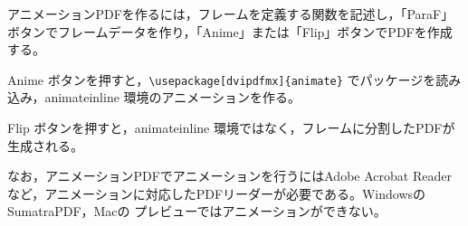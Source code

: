 \documentclass[papersize,a4paper,12pt,uplatex]{jsarticle}
\begin{document}
アニメーションPDFを作るには，フレームを定義する関数を記述し，「ParaF」ボタンでフレームデータを作り，「Anime」または「Flip」ボタンでPDFを作成する。




Anime ボタンを押すと，\verb|\usepackage[dvipdfmx]{animate}| でパッケージを読み込み，animateinline 環境のアニメーションを作る。

Flip ボタンを押すと，animateinline 環境ではなく，フレームに分割したPDFが生成される。

なお，アニメーションPDFでアニメーションを行うにはAdobe Acrobat Reader など，アニメーションに対応したPDFリーダーが必要である。WindowsのSumatraPDF，Macの プレビューではアニメーションができない。
\end{document}
